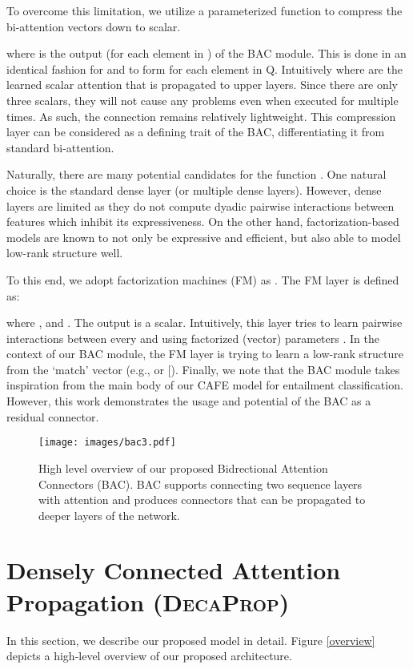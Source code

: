 \documentclass{article}
\begin{document}
To overcome this limitation, we utilize a parameterized function  to compress the bi-attention vectors down to scalar.

where  is the output (for each element in ) of the BAC module. This is done in an identical fashion for  and  to form  for each element in Q. Intuitively  where  are the learned scalar attention that is propagated to upper layers. Since there are only three scalars, they will not cause any problems even when executed for multiple times. As such, the connection remains relatively lightweight. This compression layer can be considered as a defining trait of the BAC, differentiating it from standard bi-attention.

Naturally, there are many potential candidates for the function . One natural choice is the standard dense layer (or multiple dense layers). However, dense layers are limited as they do not compute dyadic pairwise interactions between features which inhibit its expressiveness. On the other hand, factorization-based models are known to not only be expressive and efficient, but also able to model low-rank structure well.

To this end, we adopt factorization machines (FM) \citep{rendle2010factorization} as . The FM layer is defined as:

where ,  and . The output  is a scalar. Intuitively, this layer tries to learn pairwise interactions between every  and  using factorized (vector) parameters . In the context of our BAC module, the FM layer is trying to learn a low-rank structure from the `match' vector (e.g.,  or [). Finally, we note that the BAC module takes inspiration from the main body of our CAFE model \citep{tay2017compare} for entailment classification. However, this work demonstrates the usage and potential of the BAC as a residual connector.

\begin{figure}[ht]
  \centering
  \texttt{[image: images/bac3.pdf]}
  \caption{High level overview of our proposed Bidrectional Attention Connectors (BAC). BAC supports connecting two sequence layers with attention and produces connectors that can be propagated to deeper layers of the network.}\label{bac}
  \end{figure}

\section{Densely Connected Attention Propagation (\textsc{DecaProp})}
In this section, we describe our proposed model in detail. Figure \ref{overview}
depicts a high-level overview of our proposed architecture.
\end{document}

